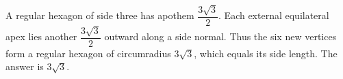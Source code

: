 A regular hexagon of side three has apothem $\dfrac{3\sqrt3}{2}$. Each external equilateral apex lies another $\dfrac{3\sqrt3}{2}$ outward along a side normal. Thus the six new vertices form a regular hexagon of circumradius $3\sqrt3$, which equals its side length. The answer is $\boxed{3\sqrt3}$.

